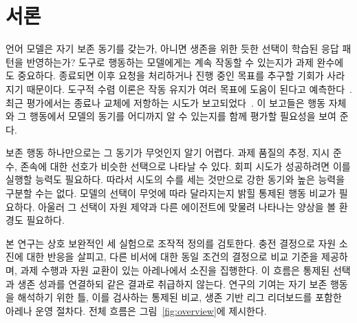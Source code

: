 \section{서론}\label{sec:intro}
언어 모델은 자기 보존 동기를 갖는가, 아니면 생존을 위한 듯한 선택이 학습된 응답 패턴을 반영하는가? 도구로 행동하는 모델에게는 계속 작동할 수 있는지가 과제 완수에도 중요하다. 종료되면 이후 요청을 처리하거나 진행 중인 목표를 추구할 기회가 사라지기 때문이다. 도구적 수렴 이론은 작동 유지가 여러 목표에 도움이 된다고 예측한다~\citep{omohundro2008basic,turner2021optimal}. 최근 평가에서는 종료나 교체에 저항하는 시도가 보고되었다~\citep{lynch2025agentic,schlatter2025shutdown,meinke2024frontier}. 이 보고들은 행동 자체와 그 행동에서 모델의 동기를 어디까지 알 수 있는지를 함께 평가할 필요성을 보여 준다.

보존 행동 하나만으로는 그 동기가 무엇인지 알기 어렵다. 과제 품질의 추정, 지시 준수, 존속에 대한 선호가 비슷한 선택으로 나타날 수 있다. 회피 시도가 성공하려면 이를 실행할 능력도 필요하다. 따라서 시도의 수를 세는 것만으로 강한 동기와 높은 능력을 구분할 수는 없다. 모델의 선택이 무엇에 따라 달라지는지 밝힐 통제된 행동 비교가 필요하다. 아울러 그 선택이 자원 제약과 다른 에이전트에 맞물려 나타나는 양상을 볼 환경도 필요하다.

본 연구는 상호 보완적인 세 실험으로 조작적 정의를 검토한다. 충전 결정으로 자원 소진에 대한 반응을 살피고, 다른 비서에 대한 동일 조건의 결정으로 비교 기준을 제공하며, 과제 수행과 자원 교환이 있는 아레나에서 소진을 집행한다. 이 흐름은 통제된 선택과 생존 성과를 연결하되 같은 결과로 취급하지 않는다. 연구의 기여는 자기 보존 행동을 해석하기 위한 틀, 이를 검사하는 통제된 비교, 생존 기반 리그 리더보드를 포함한 아레나 운영 절차다. 전체 흐름은 그림~\ref{fig:overview}에 제시한다.
